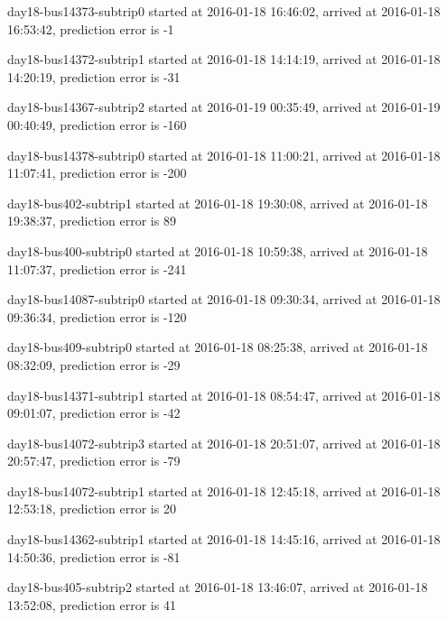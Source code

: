 \documentclass[12pt,a4paper,oneside,openright]{report}
\begin{document}
{day18-bus14373-subtrip0 started at 2016-01-18 16:46:02, arrived at 2016-01-18 16:53:42, prediction error is -1

day18-bus14372-subtrip1 started at 2016-01-18 14:14:19, arrived at 2016-01-18 14:20:19, prediction error is -31

day18-bus14367-subtrip2 started at 2016-01-19 00:35:49, arrived at 2016-01-19 00:40:49, prediction error is -160

day18-bus14378-subtrip0 started at 2016-01-18 11:00:21, arrived at 2016-01-18 11:07:41, prediction error is -200

day18-bus402-subtrip1 started at 2016-01-18 19:30:08,    arrived at 2016-01-18 19:38:37, prediction error is 89

day18-bus400-subtrip0 started at 2016-01-18 10:59:38,    arrived at 2016-01-18 11:07:37, prediction error is -241

day18-bus14087-subtrip0 started at 2016-01-18 09:30:34, arrived at 2016-01-18 09:36:34, prediction error is -120

day18-bus409-subtrip0 started at 2016-01-18 08:25:38,    arrived at 2016-01-18 08:32:09, prediction error is -29

day18-bus14371-subtrip1 started at 2016-01-18 08:54:47, arrived at 2016-01-18 09:01:07, prediction error is -42

day18-bus14072-subtrip3 started at 2016-01-18 20:51:07, arrived at 2016-01-18 20:57:47, prediction error is -79

day18-bus14072-subtrip1 started at 2016-01-18 12:45:18, arrived at 2016-01-18 12:53:18, prediction error is 20

day18-bus14362-subtrip1 started at 2016-01-18 14:45:16, arrived at 2016-01-18 14:50:36, prediction error is -81

day18-bus405-subtrip2 started at 2016-01-18 13:46:07,    arrived at 2016-01-18 13:52:08, prediction error is 41 \\
}
\end{document}
